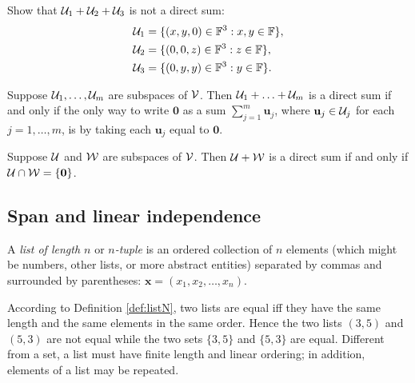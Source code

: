 \begin{exc}
  Show that ${\cal U}_1 + {\cal U}_2 + {\cal U}_3$
  is not a direct sum:
  \begin{align*}
    {\cal U}_1 &= \{(x,y,0)\in \mathbb{F}^3: x,y\in \mathbb{F}\},
    \\
    {\cal U}_2 &= \{(0,0,z)\in \mathbb{F}^3: z\in \mathbb{F}\},
    \\
    {\cal U}_3 &= \{(0,y,y)\in \mathbb{F}^3: y\in \mathbb{F}\}.
  \end{align*}
\end{exc}

\begin{lem}
  Suppose ${\cal U}_1, \ldots, {\cal U}_m$ are subspaces of ${\cal V}$.
  Then ${\cal U}_1 + \ldots + {\cal U}_m$
  is a direct sum if and only if
  the only way to write $\mathbf{0}$ as a sum 
  $\sum_{j=1}^m\mathbf{u}_j$,
  where $\mathbf{u}_j \in {\cal U}_j$ for each $j=1, \ldots, m$,
  is by taking each $\mathbf{u}_j$ equal to $\mathbf{0}$.
\end{lem}

\begin{thm}
  \label{thm:directSumIFFintersection0}
  Suppose ${\cal U}$ and ${\cal W}$ are subspaces of ${\cal V}$.
  Then ${\cal U}+{\cal W}$ is a direct sum
  if and only if ${\cal U}\cap {\cal W}=\{\mathbf{0}\}$.
\end{thm}

\subsection{Span and linear independence}
\label{sec:span-line-indep}

\begin{defn}
  \label{def:listN}
  A \emph{list of length $n$} or \emph{$n$-tuple}
  is an ordered collection of $n$ elements
  (which might be numbers, other lists, or more abstract entities)
  separated by commas and surrounded by parentheses:
  $\mathbf{x} = (x_1, x_2, \ldots, x_n)$.
\end{defn}

\begin{rem}
  According to Definition \ref{def:listN},
  two lists are equal iff
  they have the same length and the same elements in the same order.
  Hence the two lists $(3,5)$ and $(5,3)$ are not equal
  while the two sets $\{3,5\}$ and $\{5,3\}$ are equal.
  Different from a set,
  a list must have finite length and linear ordering;
  in addition, elements of a list may be repeated.
\end{rem}

